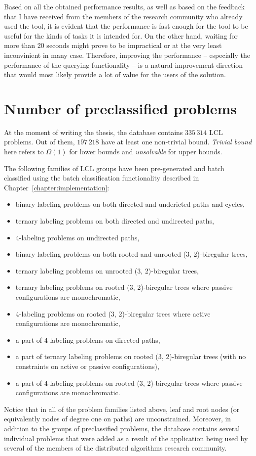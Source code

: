 Based on all the obtained performance results, as
well as based on the feedback that I have received
from the members of the research community who
already used the tool, it is
evident that the performance is fast enough for the
tool to be useful for the kinds of tasks it is intended for.
On the other hand, waiting for more than 20 seconds might prove
to be impractical or at the very least inconvinient
in many case. Therefore, improving the
performance -- especially
the performance of the querying functionality -- is
a natural improvement direction that would most
likely provide a lot of value for the users of the solution.

\section{Number of preclassified problems}

At the moment of writing the thesis, the database contains $335\,314$
LCL problems. Out of them, $197\,218$ have at least one non-trivial bound. \emph{Trivial bound} here
refers to $\Omega(1)$ for lower bounds and \emph{unsolvable} for upper bounds.

The following families of LCL groups have been pre-generated and batch classified
using the batch classification functionality described in Chapter~\ref{chapter:implementation}:

\begin{itemize}
  \item binary labeling problems on both directed and undericted paths and cycles,
  \item ternary labeling problems on both directed and undirected paths,
  \item 4-labeling problems on undirected paths,
  \item binary labeling problems on both rooted and unrooted (3, 2)-biregular trees,
  \item ternary labeling problems on unrooted (3, 2)-biregular trees,
  \item ternary labeling problems on rooted (3, 2)-biregular trees where passive configurations are monochromatic,
  \item 4-labeling problems on rooted (3, 2)-biregular trees where active configurations are monochromatic,
  \item a part of 4-labeling problems on directed paths,
  \item a part of ternary labeling problems on rooted (3, 2)-biregular trees (with no constraints on active or passive configurations),
  \item a part of 4-labeling problems on rooted (3, 2)-biregular trees where passive configurations are monochromatic.
\end{itemize}
Notice that in all of the problem families listed above, leaf and root nodes
(or equivalently nodes of degree one on paths) are unconstrained. Moreover, in addition to the
groups of preclassified problems, the database contains several individual problems that
were added as a result of the application being used by several of the members of the
distributed algorithms research community.

